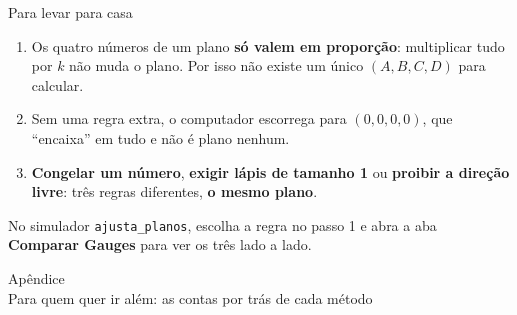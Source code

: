\documentclass[aspectratio=169,11pt]{beamer}
\newcommand{\bnum}[1]{\textbf{\textcolor{mTeal}{#1}}}
\begin{document}
\begin{frame}{Para levar para casa}
  \begin{enumerate}
    \setlength{\itemsep}{10pt}
    \item Os quatro números de um plano \bnum{só valem em proporção}: multiplicar tudo por $k$
          não muda o plano. Por isso não existe um único $(A, B, C, D)$ para calcular.
    \item Sem uma regra extra, o computador \alert{escorrega para $(0, 0, 0, 0)$}, que
          ``encaixa'' em tudo e não é plano nenhum.
    \item \textcolor{corReducao}{\textbf{Congelar um número}},
          \textcolor{corInjuncao}{\textbf{exigir lápis de tamanho 1}} ou
          \textcolor{corPseudo}{\textbf{proibir a direção livre}}:
          três regras diferentes, \bnum{o mesmo plano}.
  \end{enumerate}
  \bigskip
  \begin{ideia}[title={Experimente}]
    No simulador \texttt{ajusta\_planos}, escolha a regra no passo 1 e abra a aba
    \textbf{Comparar Gauges} para ver os três lado a lado.
  \end{ideia}
\end{frame}

\appendix

\begin{frame}[standout]
  Apêndice\\[6pt]
  {\normalsize Para quem quer ir além: as contas por trás de cada método}
\end{frame}
\end{document}
